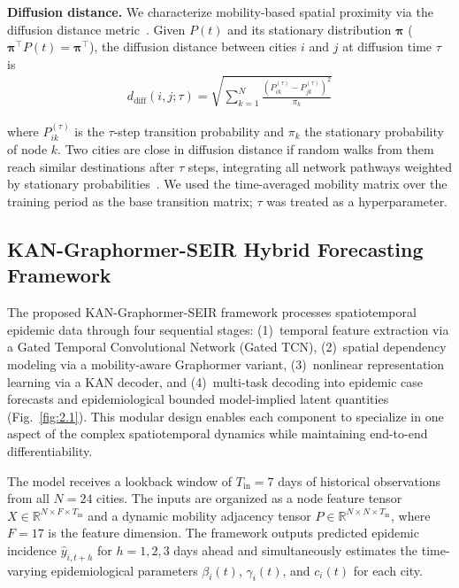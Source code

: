 \documentclass[10pt,letterpaper]{article}
\begin{document}
	\noindent\textbf{Diffusion distance.}
	We characterize mobility-based spatial proximity via the diffusion distance
	metric~\cite{coifman2006}. Given $P(t)$ and its stationary distribution
	$\boldsymbol{\pi}$ ($\boldsymbol{\pi}^\top P(t) = \boldsymbol{\pi}^\top$),
	the diffusion distance between cities $i$ and $j$ at diffusion time $\tau$ is
	\begin{align}
		d_{\mathrm{diff}}(i,j;\tau)
		= \sqrt{
			\sum_{k=1}^{N}
			\frac{(P_{ik}^{(\tau)} - P_{jk}^{(\tau)})^2}{\pi_k}
		}
		\label{eq:diffusion_distance}
	\end{align}
	
	\noindent where $P_{ik}^{(\tau)}$ is the $\tau$-step transition probability
	and $\pi_k$ the stationary probability of node $k$. Two cities are close in
	diffusion distance if random walks from them reach similar destinations after
	$\tau$ steps, integrating all network pathways weighted by stationary
	probabilities~\cite{coifman2006}. We used the time-averaged mobility matrix
	over the training period as the base transition matrix; $\tau$ was treated as
	a hyperparameter.
	
	\subsection*{KAN-Graphormer-SEIR Hybrid Forecasting Framework}
	
	
	The proposed KAN-Graphormer-SEIR framework processes spatiotemporal epidemic data through
	four sequential stages: (1)~temporal feature extraction via a Gated Temporal
	Convolutional Network (Gated TCN), (2)~spatial dependency modeling via a mobility-aware Graphormer variant, (3)~nonlinear representation learning via a KAN decoder, and (4)~multi-task decoding into epidemic
	case forecasts and epidemiological bounded model-implied latent quantities (Fig.~\ref{fig:2.1}). This
	modular design enables each component to specialize in one aspect of the complex
	spatiotemporal dynamics while maintaining end-to-end differentiability.
	
	The model receives a lookback window of $T_{\mathrm{in}} = 7$ days of historical
	observations from all $N = 24$ cities. The inputs are organized as a node feature
	tensor $X \in \mathbb{R}^{N \times F \times T_{\mathrm{in}}}$ and a dynamic mobility
	adjacency tensor $P \in \mathbb{R}^{N \times N \times T_{\mathrm{in}}}$, where $F = 17$
	is the feature dimension. The framework outputs predicted epidemic incidence
	$\hat{y}_{i, t+h}$ for $h = 1, 2, 3$ days ahead and simultaneously estimates the
	time-varying epidemiological parameters $\beta_i(t)$, $\gamma_i(t)$, and
	$c_i(t)$ for each city.
	
\end{document}
